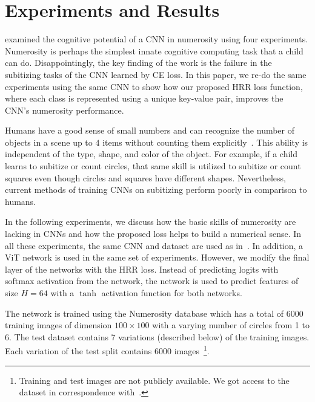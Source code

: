 \documentclass[letterpaper]{article} %
\DeclarePairedDelimiter{\norm}{\lVert}{\rVert}
\begin{document}


\section{Experiments and Results} \label{sec:experiments}
\citet{b1} examined the cognitive potential of a CNN in numerosity using four experiments. Numerosity is perhaps the simplest innate cognitive computing task that a child can do.  Disappointingly, the key finding of the work is the failure in the subitizing tasks of the CNN learned by CE loss. In this paper, we re-do the same experiments using the same CNN to show how our proposed HRR loss function, where each class is represented using a unique key-value pair, improves the CNN’s numerosity performance.
\par 
Humans have a good sense of small numbers and can recognize the number of objects in a scene up to $4$ items without counting them explicitly~\cite{b4, b5, b6}. This ability is independent of the type, shape, and color of the object.  For example, if a child learns to subitize or count circles, that same skill is utilized to subitize or count squares even though circles and squares have different shapes. Nevertheless, current methods of training CNNs on subitizing perform poorly in comparison to humans.
\par 
In the following experiments, we discuss how the basic skills of numerosity are lacking in CNNs and how the proposed loss helps to build a numerical sense. In all these experiments, the same CNN and dataset are used as in~\cite{b1}.  In addition, a ViT network is used in the same set of experiments. However, we modify the final layer of the networks with the HRR loss. Instead of predicting logits with softmax activation from the network, the network is used to predict features of size $H=64$ with a $\tanh$ activation function for both networks.
\par 
The network is trained using the Numerosity database which has a total of $6000$ training images of dimension $100 \times 100$ with a varying number of circles from 1 to 6. The test dataset contains 7 variations (described below) of the training images. Each variation of the test split contains $6000$ images~\footnote{Training and test images are not publicly available. We got access to the dataset in correspondence with~\cite{b1}.}.
\end{document}
